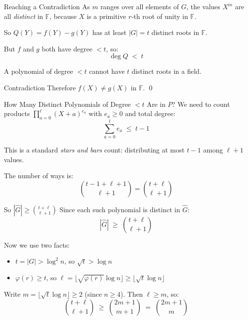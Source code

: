 \documentclass{beamer}
\begin{document}
\begin{frame}{Reaching a Contradiction}
As $m$ ranges over all elements of $G$, the values $X^m$ are all
\emph{distinct} in $\mathbb{F}$, because $X$ is a primitive $r$-th
root of unity in $\mathbb{F}$.
\vspace{1em}

So $Q(Y) = f(Y) - g(Y)$ has at least $|G| = t$ distinct roots in $\mathbb{F}$.
\vspace{1em}

But $f$ and $g$ both have degree $< t$, so:
\[
    \deg Q \;<\; t
\]
\vspace{0.5em}

A polynomial of degree $< t$ cannot have $t$ distinct roots in a field.
\vspace{1em}

\begin{block}{Contradiction}
Therefore $f(X) \ne g(X)$ in $\mathbb{F}$. \qed
\end{block}
\end{frame}


\begin{frame}{How Many Distinct Polynomials of Degree $< t$ Are in $P$?}
We need to count products $\prod_{a=0}^{\ell}(X+a)^{e_a}$ with $e_a \ge 0$
and total degree:
\[
    \sum_{a=0}^{\ell} e_a \;\le\; t - 1
\]

This is a standard \emph{stars and bars} count: distributing at most $t-1$
among $\ell + 1$ values.

The number of ways is:
\[
    \binom{t - 1 + \ell + 1}{\ell + 1} = \binom{t + \ell}{\ell + 1}
\]
\end{frame}


\begin{frame}{So $|\hat{G}| \ge \binom{t+\ell}{\ell+1}$}
Since each such polynomial is distinct in $\hat{G}$:
\[
    |\hat{G}| \;\ge\; \binom{t+\ell}{\ell+1}
\]

Now we use two facts:
\begin{itemize}
    \item $t = |G| > \log^2 n$, so $\sqrt{t} > \log n$
    \item $\varphi(r) \ge t$, so $\ell = \lfloor\sqrt{\varphi(r)}\log n\rfloor \ge \lfloor\sqrt{t}\log n\rfloor$
\end{itemize}

Write $m = \lfloor \sqrt{t} \log n \rfloor \ge 2$ (since $n \ge 4$). Then $\ell \ge m$, so:
\[
    \binom{t+\ell}{\ell+1} \;\ge\; \binom{2m+1}{m+1} \;=\; \binom{2m+1}{m}
\]
\end{frame}
\end{document}
